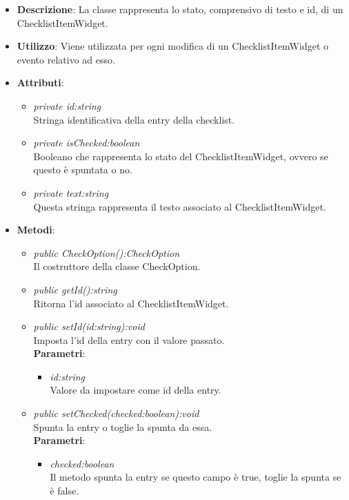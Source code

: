 \begin{itemize}
\item \textbf{Descrizione}: La classe rappresenta lo stato, comprensivo di testo e id, di un ChecklistItemWidget.
\item \textbf{Utilizzo}: Viene utilizzata per ogni modifica di un ChecklistItemWidget o evento relativo ad esso.
\item \textbf{Attributi}:
	\begin{itemize}
	\item \textit{private id:string}\\
	Stringa identificativa della entry della checklist.
	\item \textit{private isChecked:boolean}\\
	Booleano che rappresenta lo stato del ChecklistItemWidget, ovvero se questo è spuntata o no.
	\item \textit{private text:string}\\
	Questa stringa rappresenta il testo associato al ChecklistItemWidget.
	\end{itemize}
\item \textbf{Metodi}:
	\begin{itemize}
	\item \textit{public CheckOption():CheckOption}\\
	Il costruttore della classe CheckOption.
	\item \textit{public getId():string}\\
	Ritorna l'id associato al ChecklistItemWidget.
	\item \textit{public setId(id:string):void}\\
	Imposta l'id della entry con il valore passato.
		\\ \textbf{Parametri}: \begin{itemize}
		\item \textit{id:string}\\
			Valore da impostare come id della entry.
		\end{itemize}
	\item \textit{public setChecked(checked:boolean):void}\\
	Spunta la entry o toglie la spunta da essa.
		\\ \textbf{Parametri}: \begin{itemize}
		\item \textit{checked:boolean}\\
		Il metodo spunta la entry se questo campo è true, toglie la spunta se è false.
		\end{itemize} 

\end{itemize}
\end{itemize}
